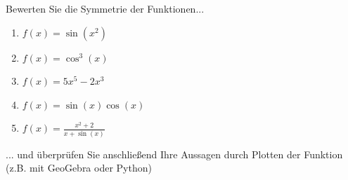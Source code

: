 \begin{ExerciseBlock}
Bewerten Sie die Symmetrie der Funktionen...

\begin{enumerate}[label=\alph*)]
\item $\displaystyle f(x) = \sin(x^2)$
\item $\displaystyle f(x) = \cos^3(x)$
\item $\displaystyle f(x) = 5 x^5 - 2 x^3$
\item $\displaystyle f(x) = \sin(x) \cos(x)$
\item $\displaystyle f(x) = \frac{x^2 + 2}{x + \sin(x)}$
\end{enumerate}
... und überprüfen Sie anschließend Ihre Aussagen durch Plotten der Funktion (z.B. mit GeoGebra oder Python)

\end{ExerciseBlock}
